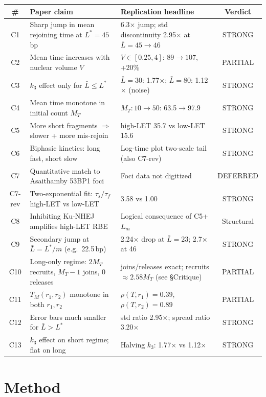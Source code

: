 \documentclass[11pt]{article}
\begin{document}
\begin{longtable}{@{}c p{7.7cm} p{4.5cm} c@{}}
\toprule
\# & Paper claim & Replication headline & Verdict \\
\midrule
\endhead
C1 & Sharp jump in mean rejoining time at $L^\ast=45$\,bp & 6.3$\times$ jump; std discontinuity 2.95$\times$ at $\bar L{=}45\!\to\!46$ & STRONG \\
C2 & Mean time increases with nuclear volume $V$ & $V{\in}[0.25,4]$: $89\!\to\!107$, +20\% & PARTIAL \\
C3 & $k_3$ effect only for $\bar L \le L^\ast$ & $\bar L=30$: 1.77$\times$; $\bar L=80$: 1.12$\times$ (noise) & STRONG \\
C4 & Mean time monotone in initial count $M_T$ & $M_T{:}10\!\to\!50$: 63.5$\to$97.9 & STRONG \\
C5 & More short fragments $\Rightarrow$ slower + more mis-rejoin & high-LET 35.7 vs low-LET 15.6 & STRONG \\
C6 & Biphasic kinetics: long fast, short slow & Log-time plot two-scale tail (also C7-rev) & STRONG \\
C7 & Quantitative match to Asaithamby 53BP1 foci & Foci data not digitized & DEFERRED \\
C7-rev & Two-exponential fit: $\tau_s\!/\!\tau_f$ high-LET vs low-LET & 3.58 vs 1.00 & STRONG \\
C8 & Inhibiting Ku-NHEJ amplifies high-LET RBE & Logical consequence of C5+$L_m$ & Structural \\
C9 & Secondary jump at $\bar L = L^\ast\!/m$ (e.g.\ 22.5\,bp) & 2.24$\times$ drop at $\bar L{=}23$; 2.7$\times$ at 46 & STRONG \\
C10 & Long-only regime: $2M_T$ recruits, $M_T{-}1$ joins, 0 releases & joins/releases exact; recruits$\approx 2.58 M_T$ (see \S Critique) & PARTIAL \\
C11 & $T_M(r_1,r_2)$ monotone in both $r_1,r_2$ & $\rho(T,r_1){=}0.39$, $\rho(T,r_2){=}0.89$ & PARTIAL \\
C12 & Error bars much smaller for $\bar L > L^\ast$ & std ratio 2.95$\times$; spread ratio 3.20$\times$ & STRONG \\
C13 & $k_3$ effect on short regime; flat on long & Halving $k_3$: 1.77$\times$ vs 1.12$\times$ & STRONG \\
\bottomrule
\end{longtable}

\section{Method}
\end{document}
